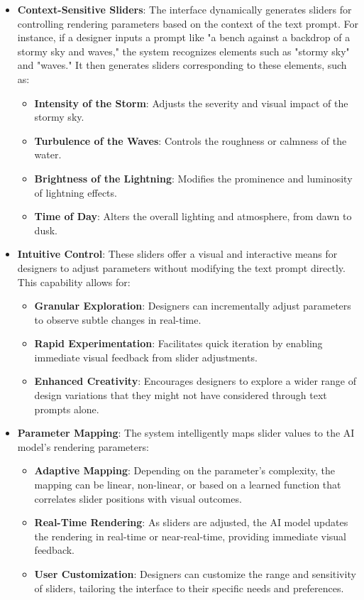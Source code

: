 \documentclass[12pt]{report}
\begin{document}
\begin{itemize}
    \item \textbf{Context-Sensitive Sliders}: The interface dynamically generates sliders for controlling rendering parameters based on the context of the text prompt. For instance, if a designer inputs a prompt like "a bench against a backdrop of a stormy sky and waves," the system recognizes elements such as "stormy sky" and "waves." It then generates sliders corresponding to these elements, such as:

    \begin{itemize}
        \item \textbf{Intensity of the Storm}: Adjusts the severity and visual impact of the stormy sky.
        \item \textbf{Turbulence of the Waves}: Controls the roughness or calmness of the water.
        \item \textbf{Brightness of the Lightning}: Modifies the prominence and luminosity of lightning effects.
        \item \textbf{Time of Day}: Alters the overall lighting and atmosphere, from dawn to dusk.
    \end{itemize}

    \item \textbf{Intuitive Control}: These sliders offer a visual and interactive means for designers to adjust parameters without modifying the text prompt directly. This capability allows for:

    \begin{itemize}
        \item \textbf{Granular Exploration}: Designers can incrementally adjust parameters to observe subtle changes in real-time.
        \item \textbf{Rapid Experimentation}: Facilitates quick iteration by enabling immediate visual feedback from slider adjustments.
        \item \textbf{Enhanced Creativity}: Encourages designers to explore a wider range of design variations that they might not have considered through text prompts alone.
    \end{itemize}

    \item \textbf{Parameter Mapping}: The system intelligently maps slider values to the AI model's rendering parameters:

    \begin{itemize}
        \item \textbf{Adaptive Mapping}: Depending on the parameter's complexity, the mapping can be linear, non-linear, or based on a learned function that correlates slider positions with visual outcomes.
        \item \textbf{Real-Time Rendering}: As sliders are adjusted, the AI model updates the rendering in real-time or near-real-time, providing immediate visual feedback.
        \item \textbf{User Customization}: Designers can customize the range and sensitivity of sliders, tailoring the interface to their specific needs and preferences.
    \end{itemize}


\end{itemize}
\end{document}
